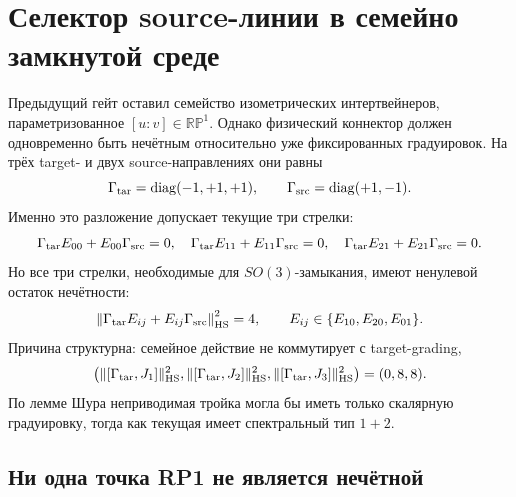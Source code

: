 \chapter{Селектор source-линии в семейно замкнутой среде}
\label{ch:v8-baryon-c0-so3-closed-environment-source-line-selector-gate}

Предыдущий гейт оставил семейство изометрических интертвейнеров,
параметризованное $[u:v]\in\mathbb {RP}^1$. Однако физический коннектор
должен одновременно быть нечётным относительно уже фиксированных
градуировок. На трёх target- и двух source-направлениях они равны
\begin{equation}
 \Gamma_{\rm tar}=\operatorname{diag}(-1,+1,+1),
 \qquad \Gamma_{\rm src}=\operatorname{diag}(+1,-1).
 \label{eq:v8-baryon-c0-source-line-current-gradings}
\end{equation}
Именно это разложение допускает текущие три стрелки:
\begin{equation}
 \Gamma_{\rm tar}E_{00}+E_{00}\Gamma_{\rm src}=0,
 \quad
 \Gamma_{\rm tar}E_{11}+E_{11}\Gamma_{\rm src}=0,
 \quad
 \Gamma_{\rm tar}E_{21}+E_{21}\Gamma_{\rm src}=0.
 \label{eq:v8-baryon-c0-current-three-arrows-odd}
\end{equation}
Но все три стрелки, необходимые для $SO(3)$-замыкания, имеют ненулевой
остаток нечётности:
\begin{equation}
 \left\|\Gamma_{\rm tar}E_{ij}+E_{ij}\Gamma_{\rm src}\right\|_{\rm HS}^2=4,
 \qquad E_{ij}\in\{E_{10},E_{20},E_{01}\}.
 \label{eq:v8-baryon-c0-missing-arrows-even-residual}
\end{equation}
Причина структурна: семейное действие не коммутирует с target-grading,
\begin{equation}
 \bigl(\|[\Gamma_{\rm tar},J_1]\|_{\rm HS}^2,
 \|[\Gamma_{\rm tar},J_2]\|_{\rm HS}^2,
 \|[\Gamma_{\rm tar},J_3]\|_{\rm HS}^2\bigr)=(0,8,8).
 \label{eq:v8-baryon-c0-target-grading-so3-commutator}
\end{equation}
По лемме Шура неприводимая тройка могла бы иметь только скалярную
градуировку, тогда как текущая имеет спектральный тип $1+2$.

\section{Ни одна точка RP1 не является нечётной}

